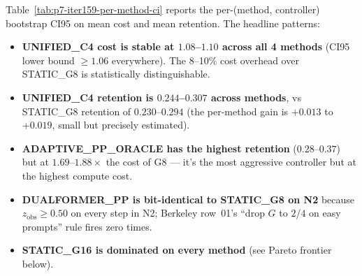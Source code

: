 \documentclass{article}
\begin{document}
Table~\ref{tab:p7-iter159-per-method-ci} reports the per-(method, controller)
bootstrap CI95 on mean cost and mean retention. The headline patterns:

\begin{itemize}
\item \textbf{UNIFIED\_C4 cost is stable at $1.08$--$1.10$ across all 4 methods}
      (CI95 lower bound $\geq 1.06$ everywhere). The 8--10\% cost overhead
      over STATIC\_G8 is statistically distinguishable.
\item \textbf{UNIFIED\_C4 retention is $0.244$--$0.307$ across methods}, vs
      STATIC\_G8 retention of $0.230$--$0.294$ (the per-method gain is
      $+0.013$ to $+0.019$, small but precisely estimated).
\item \textbf{ADAPTIVE\_PP\_ORACLE has the highest retention} ($0.28$--$0.37$)
      but at $1.69$--$1.88\times$ the cost of G8 --- it's the most aggressive
      controller but at the highest compute cost.
\item \textbf{DUALFORMER\_PP is bit-identical to STATIC\_G8 on N2} because
      $z_{\mathrm{obs}} \geq 0.50$ on every step in N2; Berkeley row~01's
      ``drop $G$ to $2$/$4$ on easy prompts'' rule fires zero times.
\item \textbf{STATIC\_G16 is dominated on every method} (see Pareto frontier
      below).
\end{itemize}
\end{document}
